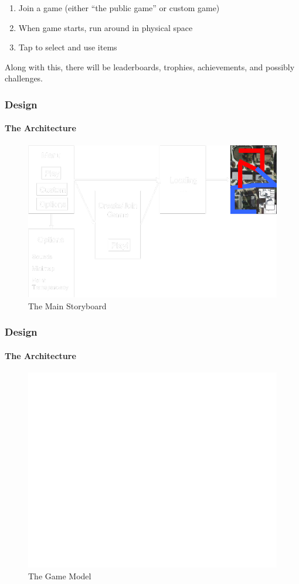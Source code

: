 \documentclass[xcolor=dvipsnames]{beamer}
\begin{document}
\begin{darkframes}
\begin{frame}
        \begin{enumerate}
            \item Join a game (either ``the public game'' or custom game)
            \item When game starts, run around in physical space
            \item Tap to select and use items
        \end{enumerate}

        Along with this, there will be leaderboards, trophies, achievements, and possibly challenges.
    \end{frame}


    \begin{frame}
        \frametitle{Design}
        \framesubtitle{The Architecture}

        \begin{figure}[!ht]
            \centering
            \includegraphics[width=.75\textwidth]{./assets/storyboard.png}
            \caption{The Main Storyboard}
        \end{figure}

    \end{frame}


    \begin{frame}
        \frametitle{Design}
        \framesubtitle{The Architecture}

        \begin{figure}[!ht]
            \centering
            \includegraphics[width=.75\textwidth]{./assets/model.png}
            \caption{The Game Model}
        \end{figure}


\end{frame}
\end{darkframes}
\end{document}
